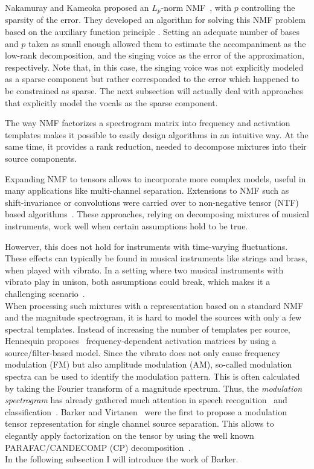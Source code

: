 Nakamuray and Kameoka proposed an $L_p$-norm NMF~\cite{nakamuray15}, with $p$ controlling the sparsity of the error. They developed an algorithm for solving this NMF problem based on the auxiliary function principle \cite{ortega70,kameoka06}. Setting an adequate number of bases and $p$ taken as small enough allowed them to estimate the accompaniment as the low-rank decomposition, and the singing voice as the error of the approximation, respectively. Note that, in this case, the singing voice was not explicitly modeled as a sparse component but rather corresponded to the error which happened to be constrained as sparse. The next subsection will actually deal with approaches that explicitly model the vocals as the sparse component.
\par
The way NMF factorizes a spectrogram matrix into frequency and activation templates makes it possible to easily design algorithms in an intuitive way. At the same time, it provides a rank reduction, needed to decompose mixtures into their source components.
\par
Expanding NMF to tensors allows to incorporate more complex models, useful in many applications like multi-channel separation.
Extensions to NMF such as shift-invariance or convolutions were carried over to non-negative tensor (NTF) based algorithms~\cite{fitzgerald05, fitzgerald08, fitzgerald06, fevotte10, ozerov11}. These approaches, relying on decomposing mixtures of musical instruments, work well when certain assumptions hold to be true.

Howerver, this does not hold for instruments with time-varying fluctuations. These effects can typically be found in musical instruments like strings and brass, when played with vibrato. In a setting where two musical instruments with vibrato play in unison, both assumptions could break, which makes it a challenging scenario~\cite{stoeter14}.\\
When processing such mixtures with a representation based on a standard NMF and the magnitude spectrogram, it is hard to model the sources with only a few spectral templates. Instead of increasing the number of templates per source, Hennequin proposes~\cite{hennequin11} frequency-dependent activation matrices by using a source/filter-based model.
Since the vibrato does not only cause frequency modulation (FM) but also amplitude modulation (AM), so-called modulation spectra can be used to identify the modulation pattern. This is often calculated by taking the Fourier transform of a magnitude spectrum. Thus, the \emph{modulation spectrogram} has already gathered much attention in speech recognition~\cite{greenberg97,kingsbury98} and classification~\cite{kinnunen08, markaki09}.
Barker and Virtanen~\cite{barker13} were the first to propose a modulation tensor representation for single channel source separation. This allows to elegantly apply factorization on the tensor by using the well known PARAFAC/CANDECOMP (CP) decomposition~\cite{myfavoritenmfbook}.\\
In the following subsection I will introduce the work of Barker.

